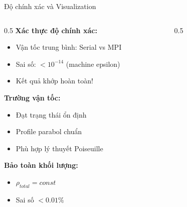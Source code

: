\documentclass[t, aspectratio=169]{beamer}
\begin{document}
	\begin{frame}{Độ chính xác và Visualization}
		\begin{columns}[T]
			\begin{column}{0.5\textwidth}
				\textbf{Xác thực độ chính xác:}
				\begin{itemize}
					\item Vận tốc trung bình: Serial vs MPI
					\item Sai số: $< 10^{-14}$ (machine epsilon)
					\item \alert{Kết quả khớp hoàn toàn!}
				\end{itemize}
				
				\vspace{1em}
				
				\textbf{Trường vận tốc:}
				\begin{itemize}
					\item Đạt trạng thái ổn định
					\item Profile parabol chuẩn
					\item Phù hợp lý thuyết Poiseuille
				\end{itemize}
				
				\vspace{1em}
				
				\textbf{Bảo toàn khối lượng:}
				\begin{itemize}
					\item $\rho_{total} = const$
					\item Sai số $< 0.01\%$
				\end{itemize}
			\end{column}
			
			\begin{column}{0.5\textwidth}
				\begin{figure}
					\centering
				\end{figure}
				
				\begin{figure}
					\centering
				\end{figure}
			\end{column}
		\end{columns}
	\end{frame}
	
\end{document}
